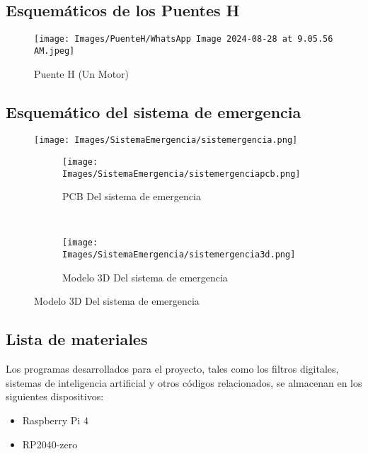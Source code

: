 \documentclass{article}
\begin{document}
\subsection{Esquemáticos de los Puentes H}
\begin{figure}[H]
    \centering
     \texttt{[image: Images/PuenteH/WhatsApp Image 2024-08-28 at 9.05.56 AM.jpeg]}
    \caption{Puente H (Un Motor)}
\end{figure}

\subsection{Esquemático del sistema de emergencia}
\begin{figure}[H]
    \centering
    \texttt{[image: Images/SistemaEmergencia/sistemergencia.png]}
    \caption{Esquemático del sistema de emegencia}


    \begin{subfigure}[t]{0.5\textwidth}
        \centering
        \texttt{[image: Images/SistemaEmergencia/sistemergenciapcb.png]}
        \caption{PCB Del sistema de emergencia}
    \end{subfigure}%
    ~ 
    \begin{subfigure}[t]{0.5\textwidth}
        \centering
        \texttt{[image: Images/SistemaEmergencia/sistemergencia3d.png]}
        \caption{Modelo 3D Del sistema de emergencia}
    \end{subfigure}

\end{figure}

\subsection{Lista de materiales}
Los programas desarrollados para el proyecto, tales como los filtros digitales, sistemas de inteligencia artificial y otros códigos relacionados, se almacenan en los siguientes dispositivos:

\begin{itemize}
    \item Raspberry Pi 4
    \item RP2040-zero
\end{itemize}
\end{document}
